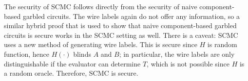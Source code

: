 The security of SCMC follows directly from the security of naive component-based garbled circuits. 
The wire labels again do not offer any information, so a similar hybrid proof that is used to show that naive component-based garbled circuits is secure works in the SCMC setting as well. 
There is a caveat: SCMC uses a new method of generating wire labels. 
This is secure since $H$ is random function, hence $H(\cdot)$ blinds $A$ and $B$; in particular, the wire labels are only distinguishable if the evaluator can determine $T$, which is not possible since $H$ is a random oracle.
Therefore, SCMC is secure. 
































